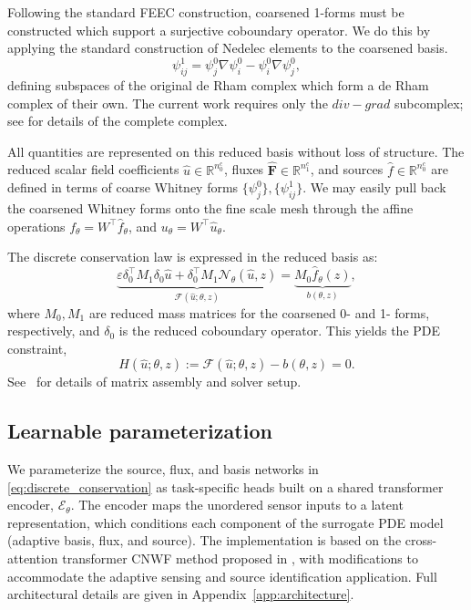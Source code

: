 \documentclass[onefignum,onetabnum]{siamart171218} %
\begin{document}
Following the standard FEEC construction, coarsened 1-forms must be constructed which support a surjective coboundary operator. We do this by applying the standard construction of Nedelec elements to the coarsened basis.
\begin{equation}
    \psi^1_{ij} = \psi^0_j \nabla \psi^0_i - \psi^0_i \nabla \psi^0_j,
\end{equation}
defining subspaces of the original de Rham complex which form a de Rham complex of their own. The current work requires only the $div-grad$ subcomplex; see \cite{actor2024data} for details of the complete complex.

All quantities are represented on this reduced basis without loss of structure. The reduced scalar field coefficients $\hat{u} \in \mathbb{R}^{n_0^c}$, fluxes $\hat{\mathbf{F}} \in \mathbb{R}^{n_1^c}$, and sources $\hat{f} \in \mathbb{R}^{n_0^c}$ are defined in terms of coarse Whitney forms $\{ \psi_j^0 \}, \{ \psi_{ij}^1 \}$. We may easily pull back the coarsened Whitney forms onto the fine scale mesh through the affine operations \(f_\theta=W^\top\hat{f}_\theta\), and \(u_\theta=W^\top\hat{u}_\theta\).

The discrete conservation law is expressed in the reduced basis as:
\begin{equation}
    \label{eq:discrete_conservation}
    \underbrace{\varepsilon\delta_0^\top M_1 \delta_0 \hat{u} + \delta_0^\top M_1 \mathcal{N}_{\theta}(\hat{u}, z)}_{\mathcal{F}(\hat{u}; \theta, z)}
    =
    \underbrace{M_0 \hat{f}_\theta(z)}_{b(\theta, z)},
\end{equation}
where $M_0, M_1$ are reduced mass matrices for the coarsened 0- and 1- forms, respectively, and $\delta_0$ is the reduced coboundary operator. This yields the PDE constraint,
\begin{equation}
    H(\hat{u}; \theta, z) := \mathcal{F}(\hat{u}; \theta, z) - b(\theta, z) = 0.
\end{equation}
See~\cite{kinch2025structure, trask2022enforcing} for details of matrix assembly and solver setup.

\subsection{Learnable parameterization}
We parameterize the source, flux, and basis networks in \eqref{eq:discrete_conservation} as task-specific heads built on a shared transformer encoder, \(\mathcal{E}_\theta\). The encoder maps the unordered sensor inputs to a latent representation, which conditions each component of the surrogate PDE model (adaptive basis, flux, and source). The implementation is based on the cross-attention transformer CNWF method proposed in \cite{kinch2025structure}, with modifications to accommodate the adaptive sensing and source identification application. Full architectural details are given in Appendix~\ref{app:architecture}.
\end{document}
